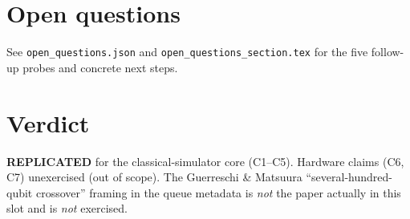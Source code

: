 \documentclass[11pt]{article}
\begin{document}
\section{Open questions}
See \texttt{open\_questions.json} and \texttt{open\_questions\_section.tex}
for the five follow-up probes and concrete next steps.

\section*{Verdict}
\textbf{REPLICATED} for the classical-simulator core (C1--C5). Hardware
claims (C6, C7) unexercised (out of scope). The Guerreschi \& Matsuura
``several-hundred-qubit crossover'' framing in the queue metadata is
\emph{not} the paper actually in this slot and is \emph{not} exercised.
\end{document}
